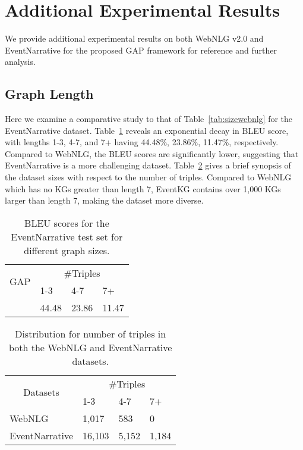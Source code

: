 \documentclass[11pt]{article}
\begin{document}
\section{Additional Experimental Results}
\label{sec:addexper}
We provide additional experimental results on both WebNLG v2.0 and EventNarrative for the proposed GAP framework for reference and further analysis. 
\subsection{Graph Length}
Here we examine a comparative study to that of Table~\ref{tab:sizewebnlg} for the EventNarrative dataset. Table~\ref{tab:sizeEvent} reveals an exponential decay in BLEU score, with lengths 1-3, 4-7, and 7+ having 44.48\%, 23.86\%, 11.47\%, respectively. Compared to WebNLG, the BLEU scores are significantly lower, suggesting that EventNarrative is a more challenging dataset. Table~\ref{tab:datasetsizes} gives a brief synopsis of the dataset sizes with respect to the number of triples. Compared to WebNLG which has no KGs greater than length 7, EventKG contains over 1,000 KGs larger than length 7, making the dataset more diverse.



\begin{table}[H]
\centering
\begin{tabular}{clll}
\hline
\multirow{2}{*}{GAP}                        & \multicolumn{3}{c}{\#Triples} \\ \cline{2-4} 
                                            & 1-3      & 4-7      & 7+      \\ \hline
\multicolumn{1}{l}{} & 44.48    & 23.86    & 11.47  \\ \hline
\end{tabular}
\caption{\label{tab:sizeEvent} BLEU scores for the EventNarrative test set for different graph sizes.}
\end{table}

\begin{table}[H]
\centering
\begin{tabular}{llll}
\hline
\multicolumn{1}{c}{\multirow{2}{*}{Datasets}} & \multicolumn{3}{c}{\#Triples} \\ \cline{2-4} 
\multicolumn{1}{c}{}                          & 1-3       & 4-7     & 7+      \\ \hline
WebNLG                                        & 1,017      & 583     & 0       \\ \hline
EventNarrative                                & 16,103     & 5,152    & 1,184    \\ \hline
\end{tabular}
\caption{\label{tab:datasetsizes} Distribution for number of triples in both the WebNLG and EventNarrative datasets.}
\end{table}
\end{document}
